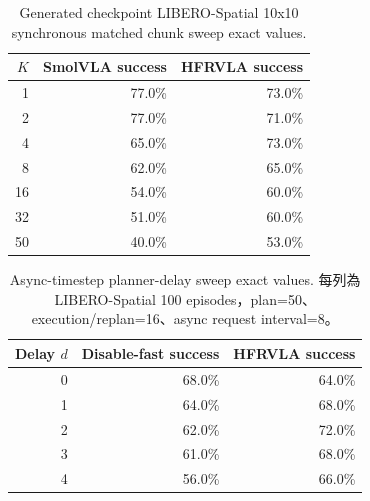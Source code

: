 \begin{table}[htbp]
\centering
\caption{Generated checkpoint LIBERO-Spatial 10x10 synchronous matched chunk sweep exact values.}
\label{tab:thesis-generated-matched}
\begin{tabular}{@{}rrr@{}}
\toprule
$K$ & SmolVLA success & HFRVLA success \\
\midrule
1 & 77.0\% & 73.0\% \\
2 & 77.0\% & 71.0\% \\
4 & 65.0\% & 73.0\% \\
8 & 62.0\% & 65.0\% \\
16 & 54.0\% & 60.0\% \\
32 & 51.0\% & 60.0\% \\
50 & 40.0\% & 53.0\% \\
\bottomrule
\end{tabular}
\end{table}

\begin{table}[htbp]
\centering
\caption{Async-timestep planner-delay sweep exact values. 每列為 LIBERO-Spatial 100 episodes，plan=50、execution/replan=16、async request interval=8。}
\label{tab:thesis-async-delay}
\begin{tabular}{@{}rrr@{}}
\toprule
Delay $d$ & Disable-fast success & HFRVLA success \\
\midrule
0 & 68.0\% & 64.0\% \\
1 & 64.0\% & 68.0\% \\
2 & 62.0\% & 72.0\% \\
3 & 61.0\% & 68.0\% \\
4 & 56.0\% & 66.0\% \\
\bottomrule
\end{tabular}
\end{table}

